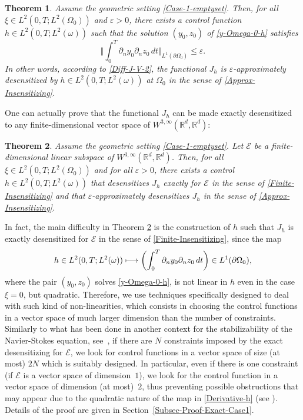 \documentclass[JEP,XML,SOM,Unicode,NoFloatCountersInSection]{cedram}
\newcommand\mto{\mathchoice{\longmapsto}{\mapsto}{\mapsto}{\mapsto}}
\newcommand\R{{\mathbb R}}
\newcommand{\bbnorm}[1]{\biggl\Vert#1\biggr\Vert}
\newtheorem{theorem}{Theorem}[section]
\theoremstyle{definition}
\begin{document}
\begin{theorem}
\label{Thm-Approx-Case1}
Assume the geometric setting \eqref{Case-1-emptyset}. Then, for all $\xi \!\in\! L^2(0,T; L^2(\Omega_0))$ and $\varepsilon >0$, there exists a control function $h \in L^2(0,T; L^2(\omega))$ such that the solution $(y_0,z_0)$ of \eqref{y-Omega-0-h} satisfies
\begin{equation}
\label{Approx-Insensitzing-Equivalent}
\bbnorm{ \int_0^T \partial_n y_0 \partial_n z_0 \, dt}_{L^1(\partial \Omega_0)} \leq \varepsilon.
\end{equation}
In other words, according to \eqref{Diff-J-V-2}, the functional $J_h$ is $\varepsilon$-approximately desensitized by $h \in L^2(0,T; L^2(\omega))$ at $\Omega_0$ in the sense of \eqref{Approx-Insensitizing}.
\end{theorem}

One can actually prove that the functional $J_h$ can be made exactly desensitized to any finite-dimensional vector space of $W^{3, \infty}(\R^d, \R^d)$:

\begin{theorem}
\label{Thm-Case1-Exact-FD}
Assume the geometric setting \eqref{Case-1-emptyset}. Let $\mathcal{E}$ be a finite-dimensional linear subspace of $W^{3, \infty}(\R^d, \R^d)$. Then, for all $\xi \in L^2(0,T; L^2(\Omega_0))$ and for all $\varepsilon>0$, there exists a control $h\in L^2(0,T; L^2(\omega))$ that desensitizes $J_h$ exactly for $\mathcal{E}$ in the sense of \eqref{Finite-Insensitizing} and that $\varepsilon$-approximately desensitizes $J_h$ in the sense of \eqref{Approx-Insensitizing}.
\end{theorem}

In fact, the main difficulty in Theorem \ref{Thm-Case1-Exact-FD} is the construction of $h$ such that $J_h$ is exactly desensitized for $\mathcal{E}$ in the sense of \eqref{Finite-Insensitizing}, since the map
\begin{equation}
\label{Derivative-h}
h \in L^2(0,T; L^2(\omega)) \mto \biggl(\int_0^T \partial_n y_0 \partial_n z_0 \, dt\biggr) \in L^1(\partial \Omega_0),
\end{equation}
where the pair $(y_0,z_0)$ solves \eqref{y-Omega-0-h}, is not linear in $h$ even in the case $\xi = 0$, but quadratic. Therefore, we use techniques specifically designed to deal with such kind of non-linearities, which consists in choosing the control functions in a vector space of much larger dimension than the number of constraints. Similarly to what has been done in another context for the stabilizability of the Navier-Stokes equation, see~\cite{Chowdhury-Erv-2019}, if there are $N$ constraints imposed by the exact desensitizing for $\mathcal E$, we look for control functions in a vector space of size (at most) $2N$ which is suitably designed. In particular, even if there is one constraint (\ie if $\mathcal{E}$ is a vector space of dimen\-sion~$1$), we look for the control function in a vector space of dimension (at most)~$2$, thus preventing possible obstructions that may appear due to the quadratic nature of the map in \eqref{Derivative-h} (see \eg \cite{Beauchard-Marbach-2017}).
Details of the proof are given in Section~\ref{Subsec-Proof-Exact-Case1}.
\end{document}
